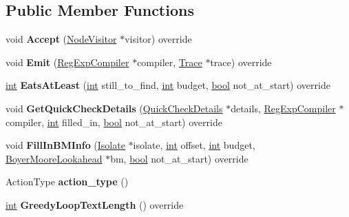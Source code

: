 \subsection*{Public Member Functions}
\begin{DoxyCompactItemize}
\item 
\mbox{\label{classv8_1_1internal_1_1ActionNode_a7211d3783a725f51fb57c05ae8900cce}} 
void {\bfseries Accept} (\mbox{\hyperlink{classv8_1_1internal_1_1NodeVisitor}{Node\+Visitor}} $\ast$visitor) override
\item 
\mbox{\label{classv8_1_1internal_1_1ActionNode_ad664161e894fe81e82ce76b7e43545a2}} 
void {\bfseries Emit} (\mbox{\hyperlink{classv8_1_1internal_1_1RegExpCompiler}{Reg\+Exp\+Compiler}} $\ast$compiler, \mbox{\hyperlink{classv8_1_1internal_1_1Trace}{Trace}} $\ast$trace) override
\item 
\mbox{\label{classv8_1_1internal_1_1ActionNode_ad318703d79f086c1b518f6008e2384b4}} 
\mbox{\hyperlink{classint}{int}} {\bfseries Eats\+At\+Least} (\mbox{\hyperlink{classint}{int}} still\+\_\+to\+\_\+find, \mbox{\hyperlink{classint}{int}} budget, \mbox{\hyperlink{classbool}{bool}} not\+\_\+at\+\_\+start) override
\item 
\mbox{\label{classv8_1_1internal_1_1ActionNode_ae590338eedba24969860acef618ee829}} 
void {\bfseries Get\+Quick\+Check\+Details} (\mbox{\hyperlink{classv8_1_1internal_1_1QuickCheckDetails}{Quick\+Check\+Details}} $\ast$details, \mbox{\hyperlink{classv8_1_1internal_1_1RegExpCompiler}{Reg\+Exp\+Compiler}} $\ast$compiler, \mbox{\hyperlink{classint}{int}} filled\+\_\+in, \mbox{\hyperlink{classbool}{bool}} not\+\_\+at\+\_\+start) override
\item 
\mbox{\label{classv8_1_1internal_1_1ActionNode_aa97507c043d2ca1971c9a9bf179ed359}} 
void {\bfseries Fill\+In\+B\+M\+Info} (\mbox{\hyperlink{classv8_1_1internal_1_1Isolate}{Isolate}} $\ast$isolate, \mbox{\hyperlink{classint}{int}} offset, \mbox{\hyperlink{classint}{int}} budget, \mbox{\hyperlink{classv8_1_1internal_1_1BoyerMooreLookahead}{Boyer\+Moore\+Lookahead}} $\ast$bm, \mbox{\hyperlink{classbool}{bool}} not\+\_\+at\+\_\+start) override
\item 
\mbox{\label{classv8_1_1internal_1_1ActionNode_ae848c71b17d244a67f3f34afe142fac8}} 
Action\+Type {\bfseries action\+\_\+type} ()
\item 
\mbox{\label{classv8_1_1internal_1_1ActionNode_a7c7df272a95395571580fca4e060f786}} 
\mbox{\hyperlink{classint}{int}} {\bfseries Greedy\+Loop\+Text\+Length} () override
\end{DoxyCompactItemize}
